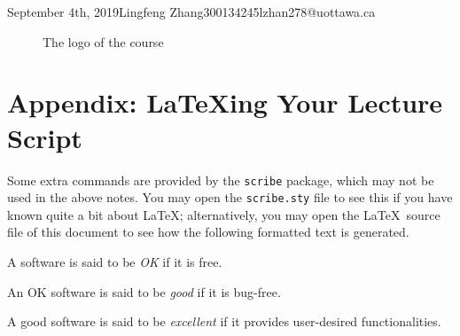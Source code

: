 \documentclass{article}
\begin{document}
\begin{lecture}{September 4th, 2019}{Lingfeng Zhang}{300134245}{lzhan278@uottawa.ca}
\begin{figure}[ht!]
\centering
{}
\caption{The logo of the course}
\label{fig:logo}
\end{figure}










\section*{Appendix: \LaTeX ing Your Lecture Script}

 Some extra commands are provided by the 
{\tt scribe} package, which may  not be used in the above notes.  
You may open the {\tt scribe.sty} file 
to see this if you have known quite a bit about \LaTeX; alternatively, 
you may open the \LaTeX\ source file of 
this document to see how the following formatted text is generated. 


\begin{definition}
A software is said to be {\em OK} if it is free. 
\end{definition}

\begin{definition}
An OK  software is said to be {\em good} if it is bug-free.
\end{definition}

\begin{definition}
A good software is said to be {\em excellent} if it provides
user-desired functionalities.
\end{definition}




\end{lecture}
\end{document}
